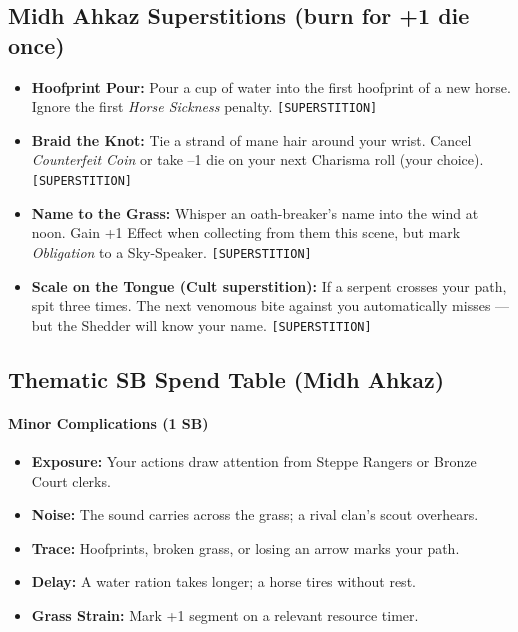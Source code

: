 {{\subsection*{Midh Ahkaz Superstitions (burn for +1 die once)}
\begin{itemize}
  \item \textbf{Hoofprint Pour:} Pour a cup of water into the first hoofprint of a new horse. Ignore the first \emph{Horse Sickness} penalty. \texttt{[SUPERSTITION]}
  \item \textbf{Braid the Knot:} Tie a strand of mane hair around your wrist. Cancel \emph{Counterfeit Coin} or take --1 die on your next Charisma roll (your choice). \texttt{[SUPERSTITION]}
  \item \textbf{Name to the Grass:} Whisper an oath-breaker's name into the wind at noon. Gain +1 Effect when collecting from them this scene, but mark \emph{Obligation} to a Sky-Speaker. \texttt{[SUPERSTITION]}
  \item \textbf{Scale on the Tongue (Cult superstition):} If a serpent crosses your path, spit three times. The next venomous bite against you automatically misses --- but the Shedder will know your name. \texttt{[SUPERSTITION]}
\end{itemize}

\subsection*{Thematic SB Spend Table (Midh Ahkaz)}
\paragraph{Minor Complications (1 SB)}
\begin{itemize}
\item \textbf{Exposure:} Your actions draw attention from Steppe Rangers or Bronze Court clerks.
\item \textbf{Noise:} The sound carries across the grass; a rival clan's scout overhears.
\item \textbf{Trace:} Hoofprints, broken grass, or losing an arrow marks your path.
\item \textbf{Delay:} A water ration takes longer; a horse tires without rest.
\item \textbf{Grass Strain:} Mark +1 segment on a relevant resource timer.
\end{itemize}

}}
